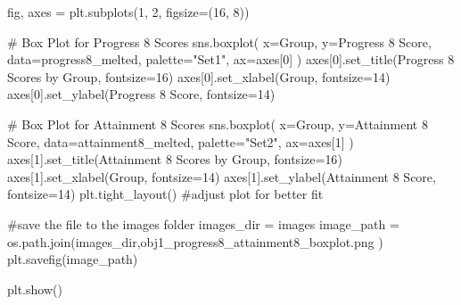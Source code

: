 \documentclass[
  letterpaper,
  DIV=11,
  numbers=noendperiod]{scrartcl}
\newenvironment{Shaded}{\begin{snugshade}}{\end{snugshade}}
\newcommand{\CommentTok}[1]{\textcolor[rgb]{0.37,0.37,0.37}{#1}}
\newcommand{\DecValTok}[1]{\textcolor[rgb]{0.68,0.00,0.00}{#1}}
\newcommand{\NormalTok}[1]{\textcolor[rgb]{0.00,0.23,0.31}{#1}}
\newcommand{\OperatorTok}[1]{\textcolor[rgb]{0.37,0.37,0.37}{#1}}
\newcommand{\StringTok}[1]{\textcolor[rgb]{0.13,0.47,0.30}{#1}}
\begin{document}
\begin{Shaded}
\begin{Highlighting}[]
\NormalTok{fig, axes }\OperatorTok{=}\NormalTok{ plt.subplots(}\DecValTok{1}\NormalTok{, }\DecValTok{2}\NormalTok{, figsize}\OperatorTok{=}\NormalTok{(}\DecValTok{16}\NormalTok{, }\DecValTok{8}\NormalTok{))}

\CommentTok{\# Box Plot for Progress 8 Scores}
\NormalTok{sns.boxplot(}
\NormalTok{    x}\OperatorTok{=}\StringTok{\textquotesingle{}Group\textquotesingle{}}\NormalTok{,}
\NormalTok{    y}\OperatorTok{=}\StringTok{\textquotesingle{}Progress 8 Score\textquotesingle{}}\NormalTok{,}
\NormalTok{    data}\OperatorTok{=}\NormalTok{progress8\_melted,}
\NormalTok{    palette}\OperatorTok{=}\StringTok{"Set1"}\NormalTok{,}
\NormalTok{    ax}\OperatorTok{=}\NormalTok{axes[}\DecValTok{0}\NormalTok{]}
\NormalTok{)}
\NormalTok{axes[}\DecValTok{0}\NormalTok{].set\_title(}\StringTok{\textquotesingle{}Progress 8 Scores by Group\textquotesingle{}}\NormalTok{, fontsize}\OperatorTok{=}\DecValTok{16}\NormalTok{)}
\NormalTok{axes[}\DecValTok{0}\NormalTok{].set\_xlabel(}\StringTok{\textquotesingle{}Group\textquotesingle{}}\NormalTok{, fontsize}\OperatorTok{=}\DecValTok{14}\NormalTok{)}
\NormalTok{axes[}\DecValTok{0}\NormalTok{].set\_ylabel(}\StringTok{\textquotesingle{}Progress 8 Score\textquotesingle{}}\NormalTok{, fontsize}\OperatorTok{=}\DecValTok{14}\NormalTok{)}

\CommentTok{\# Box Plot for Attainment 8 Scores}
\NormalTok{sns.boxplot(}
\NormalTok{    x}\OperatorTok{=}\StringTok{\textquotesingle{}Group\textquotesingle{}}\NormalTok{,}
\NormalTok{    y}\OperatorTok{=}\StringTok{\textquotesingle{}Attainment 8 Score\textquotesingle{}}\NormalTok{,}
\NormalTok{    data}\OperatorTok{=}\NormalTok{attainment8\_melted,}
\NormalTok{    palette}\OperatorTok{=}\StringTok{"Set2"}\NormalTok{,}
\NormalTok{    ax}\OperatorTok{=}\NormalTok{axes[}\DecValTok{1}\NormalTok{]}
\NormalTok{)}
\NormalTok{axes[}\DecValTok{1}\NormalTok{].set\_title(}\StringTok{\textquotesingle{}Attainment 8 Scores by Group\textquotesingle{}}\NormalTok{, fontsize}\OperatorTok{=}\DecValTok{16}\NormalTok{)}
\NormalTok{axes[}\DecValTok{1}\NormalTok{].set\_xlabel(}\StringTok{\textquotesingle{}Group\textquotesingle{}}\NormalTok{, fontsize}\OperatorTok{=}\DecValTok{14}\NormalTok{)}
\NormalTok{axes[}\DecValTok{1}\NormalTok{].set\_ylabel(}\StringTok{\textquotesingle{}Attainment 8 Score\textquotesingle{}}\NormalTok{, fontsize}\OperatorTok{=}\DecValTok{14}\NormalTok{)}
\NormalTok{plt.tight\_layout() }\CommentTok{\#adjust plot for better fit}

\CommentTok{\#save the file to the images folder}
\NormalTok{images\_dir }\OperatorTok{=} \StringTok{\textquotesingle{}images\textquotesingle{}}
\NormalTok{image\_path }\OperatorTok{=}\NormalTok{ os.path.join(images\_dir,}\StringTok{\textquotesingle{}obj1\_progress8\_attainment8\_boxplot.png\textquotesingle{}}\NormalTok{ )}
\NormalTok{plt.savefig(image\_path)}

\NormalTok{plt.show()}
\end{Highlighting}
\end{Shaded}
\end{document}
